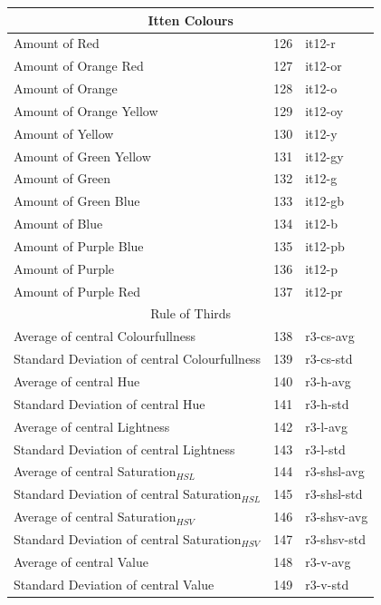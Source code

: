 \documentclass[11pt,a4paper,draft]{report}
\begin{document}
\begin{center}
\begin{longtable}{|l|c|l|}
\midrule
\multicolumn{3}{c}{Itten Colours} \\
\midrule
Amount of Red & 126 & it12-r \\
Amount of Orange Red & 127 & it12-or \\
Amount of Orange & 128 & it12-o \\
Amount of Orange Yellow & 129 & it12-oy \\
Amount of Yellow & 130 & it12-y \\
Amount of Green Yellow & 131 & it12-gy \\
Amount of Green & 132 & it12-g \\
Amount of Green Blue & 133 & it12-gb \\
Amount of Blue & 134 & it12-b \\
Amount of Purple Blue & 135 & it12-pb \\
Amount of Purple & 136 & it12-p \\
Amount of Purple Red & 137 & it12-pr \\

\midrule
\multicolumn{3}{c}{Rule of Thirds} \\
\midrule
Average of central Colourfullness & 138 & r3-cs-avg \\
Standard Deviation of central Colourfullness & 139 & r3-cs-std \\
Average of central Hue & 140 & r3-h-avg \\
Standard Deviation of central Hue & 141 & r3-h-std \\
Average of central Lightness & 142 & r3-l-avg \\
Standard Deviation of central Lightness & 143 & r3-l-std \\
Average of central Saturation$_{HSL}$ & 144 & r3-shsl-avg \\
Standard Deviation of central Saturation$_{HSL}$ & 145 & r3-shsl-std \\
Average of central Saturation$_{HSV}$ & 146 & r3-shsv-avg \\
Standard Deviation of central Saturation$_{HSV}$ & 147 & r3-shsv-std \\
Average of central Value & 148 & r3-v-avg \\
Standard Deviation of central Value & 149 & r3-v-std \\


\end{longtable}
\end{center}
\end{document}
